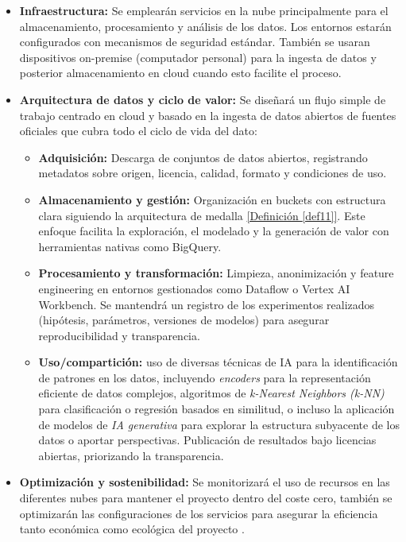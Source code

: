 \begin{itemize}
	\item \textbf{Infraestructura:} Se emplearán servicios en la nube principalmente para el almacenamiento, procesamiento y análisis de los datos. Los entornos estarán configurados con mecanismos de seguridad estándar. También se usaran dispositivos on-premise (computador personal) para la ingesta de datos y posterior almacenamiento en cloud cuando esto facilite el proceso.

	\item \textbf{Arquitectura de datos y ciclo de valor:} Se diseñará un flujo simple de trabajo centrado en cloud y basado en la ingesta de datos abiertos de fuentes oficiales que cubra todo el ciclo de vida del dato: 
	\begin{itemize}
		\item \textbf{Adquisición:} Descarga de conjuntos de datos abiertos, registrando metadatos sobre origen, licencia, calidad, formato y condiciones de uso. 
		\item \textbf{Almacenamiento y gestión:} Organización en buckets con estructura clara siguiendo la arquitectura de medalla \hyperref[def11]{[Definición \ref*{def11}]}. Este enfoque facilita la exploración, el modelado y la generación de valor con herramientas nativas como BigQuery.
		\item \textbf{Procesamiento y transformación:} Limpieza, anonimización y feature engineering en entornos gestionados como Dataflow o Vertex AI Workbench. Se mantendrá un registro de los experimentos realizados (hipótesis, parámetros, versiones de modelos) para asegurar reproducibilidad y transparencia.
		\item \textbf{Uso/compartición:} uso de diversas técnicas de IA para la identificación de patrones en los datos, incluyendo \textit{encoders} para la representación eficiente de datos complejos, algoritmos de \textit{k-Nearest Neighbors (k-NN)} para clasificación o regresión basados en similitud, o incluso la aplicación de modelos de \textit{IA generativa} para explorar la estructura subyacente de los datos o aportar perspectivas. Publicación de resultados bajo licencias abiertas, priorizando la transparencia.
	\end{itemize}
	
	\item \textbf{Optimización y sostenibilidad:} Se monitorizará el uso de recursos en las diferentes nubes para mantener el proyecto dentro del coste cero, también se optimizarán las configuraciones de los servicios para asegurar la eficiencia tanto económica como ecológica del proyecto .
\end{itemize}



